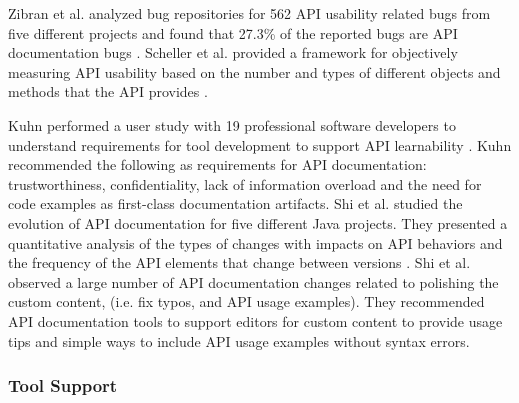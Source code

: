 \documentclass[11pt,oneside]{book}
\begin{document}
Zibran et al. analyzed bug repositories  for 562 API usability related bugs from five different projects and found that 27.3\% of the reported bugs are API documentation bugs \cite{zibran2011useful}. Scheller et al. provided a framework for objectively measuring API usability based on the number and types of different objects and methods that the API provides \cite{scheller2015automated}.

Kuhn performed a user study with 19 professional software developers to understand requirements for tool development to support API learnability \cite{Kuhn_on_designing}. Kuhn recommended the following as requirements for API documentation: trustworthiness, confidentiality, lack of information overload and the need for code examples as first-class documentation artifacts. Shi et al. studied the evolution of API documentation for five different Java projects. They presented a quantitative analysis of the types of changes with impacts on API behaviors and the frequency of the API elements that change between versions \cite{shi2011empirical}. Shi et al. observed a large number of API documentation changes related to polishing the custom content, (i.e. fix typos, and API usage examples). They recommended API documentation tools to support editors for custom content to provide usage tips and simple ways to include API usage examples without syntax errors.

\subsubsection{Tool Support} %
\label{ssub:tool_support}

\end{document}
